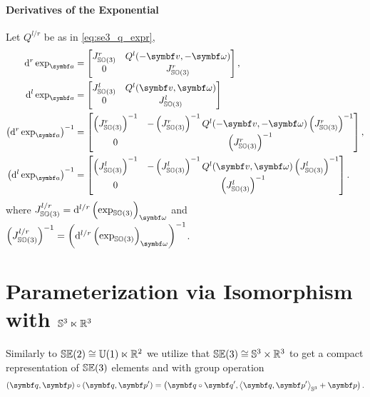 \begin{properties}[breakable, title={$\SEthree$ formula sheet}]
  \paragraph{Derivatives of the Exponential}
  Let $Q^{l/r}$ be as in \eqref{eq:se3_q_expr},
  \begin{subequations}
    \begin{align}
      \mathrm{d}^r \exp_{\a}                     & =   \begin{bmatrix} J^r_\SOthree & Q^l(-\bv, - \bomega) \\ 0 & J^r_\SOthree \end{bmatrix}, \\
      \mathrm{d}^l \exp_{\a}                     & = \begin{bmatrix} J^l_\SOthree & Q^l(\bv, \bomega) \\ 0 & J^l_\SOthree\end{bmatrix}    \\
      \left( \mathrm{d}^r \exp_{\a} \right)^{-1} & =  \begin{bmatrix} \left(J^r_\SOthree\right)^{-1}  &  -\left(J^r_\SOthree\right)^{-1} Q^l(-\bv, -\bomega)  \left(J^r_\SOthree\right)^{-1} \\ 0 &  \left(J^r_\SOthree\right)^{-1} \end{bmatrix},
      \\
      \left( \mathrm{d}^l \exp_{\a} \right)^{-1} & = \begin{bmatrix} \left(J^l_\SOthree\right)^{-1}  & -\left(J^l_\SOthree\right)^{-1} Q^l(\bv, \bomega)  \left(J^l_\SOthree\right)^{-1} \\ 0 &  \left(J^l_\SOthree\right)^{-1} \end{bmatrix} .
    \end{align}
  \end{subequations}
  where $J^{l/r}_\SOthree = \mathrm{d}^{l/r} \left( \exp_{\SOthree} \right)_\bomega$ and $\left(J^{l/r}_\SOthree \right)^{-1} = \left( \mathrm{d}^{l/r} \left( \exp_{\SOthree} \right)_\bomega \right)^{-1}$.
\end{properties}

\section{Parameterization via Isomorphism with \texorpdfstring{${\mathbb{S}^3} \ltimes \mathbb{R}^{3}$}{S3 |x R3}}

Similarly to ${\mathbb{SE}(2)} \cong {\mathbb{U}(1)} \ltimes \mathbb{R}^2$ we utilize that ${\mathbb{SE}(3)} \cong {\mathbb{S}^3} \times \mathbb{R}^3$ to get a compact representation of $\SEthree$ elements and with group operation
\begin{equation}
  \label{eq:s3_r3_composition}
  (\bq, \bp) \circ (\bq, \bp') = \left( \bq \circ \bq', \left \langle \bq, \bp' \right \rangle_\Sthree + \bp \right).
\end{equation}


